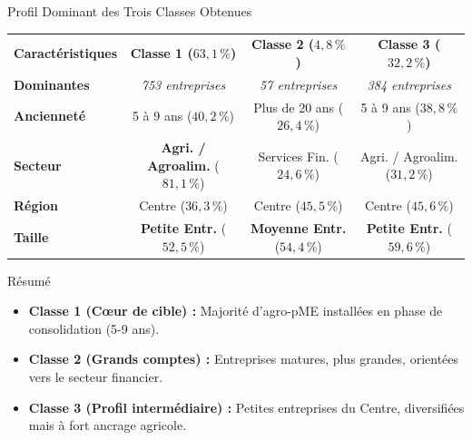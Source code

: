 \documentclass[aspectratio=169, 10pt]{beamer}
\begin{document}
\begin{frame}{Profil Dominant des Trois Classes Obtenues}
	\begin{center}
		\scriptsize
		\renewcommand{\arraystretch}{1.2}
		\begin{tabular}{l|c|c|c}
			\toprule
			\textbf{Caractéristiques} & \textbf{Classe 1 ($63,1\,\%$)} & \textbf{Classe 2 ($4,8\,\%$)} & \textbf{Classe 3 ($32,2\,\%$)} \\
			\textbf{Dominantes} & \textit{753 entreprises} & \textit{57 entreprises} & \textit{384 entreprises} \\
			\midrule
			
			\textbf{Ancienneté} & 5 à 9 ans ($40,2\,\%$) & Plus de 20 ans ($26,4\,\%$) & 5 à 9 ans ($38,8\,\%$) \\
			
			\rowcolor{gray!5}
			\textbf{Secteur} & \textbf{Agri. / Agroalim.} ($81,1\,\%$) & Services Fin. ($24,6\,\%$) & Agri. / Agroalim. ($31,2\,\%$) \\
			
			\textbf{Région} & Centre ($36,3\,\%$) & Centre ($45,5\,\%$) & Centre ($45,6\,\%$) \\
			
			\rowcolor{gray!5}
			\textbf{Taille} & \alert{\textbf{Petite Entr.}} ($52,5\,\%$) & \alert{\textbf{Moyenne Entr.}} ($54,4\,\%$) & \alert{\textbf{Petite Entr.}} ($59,6\,\%$) \\
			
			\bottomrule
		\end{tabular}
	\end{center}
	
	\begin{block}{Résumé}
		\begin{itemize}
			\tiny
			\item \textbf{Classe 1 (Cœur de cible) :} Majorité d'agro-pME installées en phase de consolidation (5-9 ans).
			\item \textbf{Classe 2 (Grands comptes) :} Entreprises matures, plus grandes, orientées vers le secteur financier.
			\item \textbf{Classe 3 (Profil intermédiaire) :} Petites entreprises du Centre, diversifiées mais à fort ancrage agricole.
		\end{itemize}
	\end{block}

\end{frame}
\end{document}

